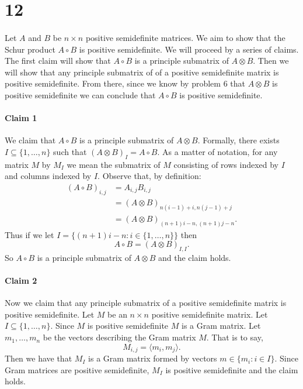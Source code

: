 \documentclass[letterpaper,12pt,oneside,onecolumn]{article}
\begin{document}
\section*{12}
\paragraph{}
Let $A$ and $B$ be $n \times n$ positive semidefinite matrices. We aim to show that the Schur product
$A \circ B$ is positive semidefinite. We will proceed by a series of claims. The first claim will show that $A\circ B$ is a principle submatrix of $A \otimes B$. Then we will show that any principle submatrix of of a positive semidefinite matrix is positive semidefinite. From there, since we know by problem $6$ that $A \otimes B$ is positive semidefinite we can conclude that $A \circ B$ is positive semidefinite.
\paragraph{Claim 1}
We claim that $A \circ B$ is a principle submatrix of $A \otimes B$. Formally, there exists $I \subseteq \{1, \dots, n\}$ such that $(A\otimes B)_I = A\circ B$. As a matter of notation, for any matrix $M$ by $M_I$ we mean the submatrix of $M$ consisting of rows indexed by $I$ and columns indexed by $I$. Observe that, by definition:
\begin{align*}
(A \circ B)_{i,j} &= A_{i,j}B_{i,j} \\
&= (A \otimes B)_{n(i-1) + i, n(j-1) + j} \\
&= (A \otimes B)_{(n+1)i -n, (n+1)j - n}.
\end{align*}
Thus if we let $I = \{(n+1)i - n: i \in \{1, \dots, n\}\}$ then $$A\circ B = (A\otimes B)_{I,I}.$$ So $A \circ B$ is a principle submatrix of $A\otimes B$ and the claim holds.
\paragraph{Claim 2}
Now we claim that any principle submatrix of a positive semidefinite matrix is positive semidefinite. Let $M$ be an $n \times n$ positive semidefinite matrix. Let $I \subseteq \{1,\dots, n\}$. Since $M$ is positive semidefinite $M$ is a Gram matrix. Let $m_1, \dots, m_n$ be the vectors describing the Gram matrix $M$. That is to say,
$$M_{i,j} = \langle m_i,m_j\rangle.$$
Then we have that $M_I$ is a Gram matrix formed by vectors $m \in \{m_i : i \in I\}$. Since Gram matrices are positive semidefinite, $M_I$ is positive semidefinite and the claim holds.
\end{document}

